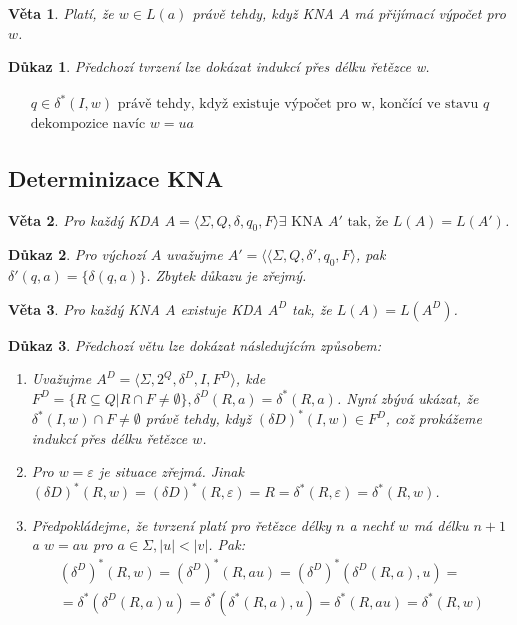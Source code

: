 \documentclass[10pt, a4paper, titlepage]{article}
\theoremstyle{note}
\newtheorem{dukaz}{Důkaz}
\newtheorem{veta}{Věta}
\begin{document}
\begin{veta}
Platí, že $w \in L(a)$ právě tehdy, když KNA $A$ má přijímací výpočet pro $w$.
\end{veta}
\begin{dukaz}
Předchozí tvrzení lze dokázat indukcí přes délku řetězce w.

\begin{gather*}
q \in \delta^{*}(I,w) \text{ právě tehdy, když existuje výpočet pro w, končící ve stavu } q \\
\text{dekompozice navíc } w = ua
\end{gather*}
\end{dukaz}

\subsection{Determinizace KNA}
\begin{veta}
Pro každý KDA $A=\langle \Sigma, Q, \delta, q_{0}, F \rangle \exists \text{ KNA } A' \text{ tak, že } L(A)=L(A') $.
\end{veta}
\begin{dukaz}
Pro výchozí $A$ uvažujme $A'=\langle \langle \Sigma, Q, \delta', q_{0}, F \rangle$, pak $\delta'(q,a) = \lbrace \delta(q,a) \rbrace$. Zbytek důkazu je zřejmý.
\end{dukaz}

\begin{veta}
Pro každý KNA $A$ existuje KDA $A^{D}$ tak, že $L(A) = L(A^{D})$.
\end{veta}
\begin{dukaz}
Předchozí větu lze dokázat následujícím způsobem:

\begin{enumerate}
\item
Uvažujme $A^{D} = \langle \Sigma, 2^{Q}, \delta^{D}, I, F^{D} \rangle$, kde $F^{D} = \lbrace R  \subseteq Q | R \cap F \neq \emptyset \rbrace, \delta^{D}(R,a) = \delta^{*}(R,a)$.
Nyní zbývá ukázat, že $\delta^{*}(I,w) \cap F \neq \emptyset$ právě tehdy, když $(\delta{D})^{*}(I,w) \in F^{D}$, což prokážeme indukcí přes délku řetězce $w$.

\item
Pro $w = \varepsilon$ je situace zřejmá. Jinak $(\delta{D})^{*} (R,w) = (\delta{D})^{*} (R, \varepsilon) = R = \delta^{*}(R, \varepsilon) = \delta^{*}(R,w)$.

\item
Předpokládejme, že tvrzení platí pro řetězce délky $n$ a nechť $w$ má délku $n+1$ a $w=au$ pro $a \in \Sigma, |u| < |v|$. Pak:
\begin{gather*}
(\delta^{D})^{*} (R,w) = (\delta^{D})^{*} (R, au) = (\delta^{D})^{*}(\delta^{D}(R,a),u) = \\
= \delta^{*}(\delta^{D}(R,a)u) = \delta^{*}(\delta^{*}(R,a),u) = \delta^{*}(R, au) = \delta^{*}(R,w)
\end{gather*}
\end{enumerate}
\end{dukaz}
\end{document}
